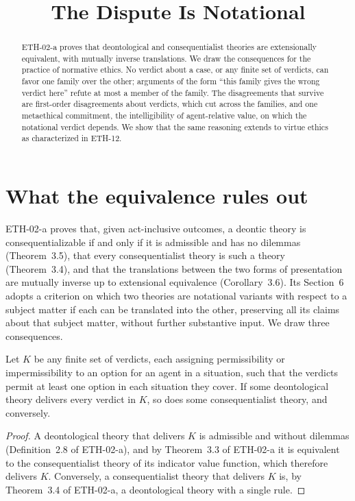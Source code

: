 \documentclass{situationist-preprint}
\title{The Dispute Is Notational}
\begin{document}
\maketitle

\begin{abstract}
ETH-02-a proves that deontological and consequentialist theories are extensionally equivalent, with mutually inverse translations. We draw the consequences for the practice of normative ethics. No verdict about a case, or any finite set of verdicts, can favor one family over the other; arguments of the form \enquote{this family gives the wrong verdict here} refute at most a member of the family. The disagreements that survive are first-order disagreements about verdicts, which cut across the families, and one metaethical commitment, the intelligibility of agent-relative value, on which the notational verdict depends. We show that the same reasoning extends to virtue ethics as characterized in ETH-12.
\end{abstract}

\section{What the equivalence rules out}

ETH-02-a proves that, given act-inclusive outcomes, a deontic theory is consequentializable if and only if it is admissible and has no dilemmas (Theorem~3.5), that every consequentialist theory is such a theory (Theorem~3.4), and that the translations between the two forms of presentation are mutually inverse up to extensional equivalence (Corollary~3.6). Its Section~6 adopts a criterion on which two theories are notational variants with respect to a subject matter if each can be translated into the other, preserving all its claims about that subject matter, without further substantive input. We draw three consequences.

\begin{proposition}\label{p:cases}
Let $K$ be any finite set of verdicts, each assigning permissibility or impermissibility to an option for an agent in a situation, such that the verdicts permit at least one option in each situation they cover. If some deontological theory delivers every verdict in $K$, so does some consequentialist theory, and conversely.
\end{proposition}

\begin{proof}
A deontological theory that delivers $K$ is admissible and without dilemmas (Definition~2.8 of ETH-02-a), and by Theorem~3.3 of ETH-02-a it is equivalent to the consequentialist theory of its indicator value function, which therefore delivers $K$. Conversely, a consequentialist theory that delivers $K$ is, by Theorem~3.4 of ETH-02-a, a deontological theory with a single rule.
\end{proof}
\end{document}
